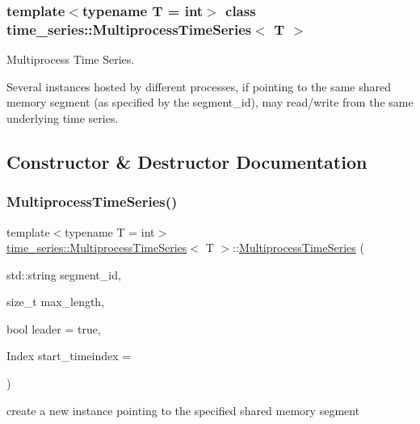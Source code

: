 \subsubsection*{template$<$typename T = int$>$\newline
class time\+\_\+series\+::\+Multiprocess\+Time\+Series$<$ T $>$}

Multiprocess Time Series. 

Several instances hosted by different processes, if pointing to the same shared memory segment (as specified by the segment\+\_\+id), may read/write from the same underlying time series. 

\subsection{Constructor \& Destructor Documentation}
\mbox{\label{classtime__series_1_1MultiprocessTimeSeries_a118890497b42365a56221c66edbb478e}} 
\subsubsection{\texorpdfstring{Multiprocess\+Time\+Series()}{MultiprocessTimeSeries()}}
{\footnotesize\ttfamily template$<$typename T  = int$>$ \\
\hyperlink{classtime__series_1_1MultiprocessTimeSeries}{time\+\_\+series\+::\+Multiprocess\+Time\+Series}$<$ T $>$\+::\hyperlink{classtime__series_1_1MultiprocessTimeSeries}{Multiprocess\+Time\+Series} (\begin{DoxyParamCaption}\item[{std\+::string}]{segment\+\_\+id,  }\item[{size\+\_\+t}]{max\+\_\+length,  }\item[{bool}]{leader = {\ttfamily true},  }\item[{Index}]{start\+\_\+timeindex = {} }\end{DoxyParamCaption})\hspace{0.3cm}{\ttfamily [inline]}}



create a new instance pointing to the specified shared memory segment 


